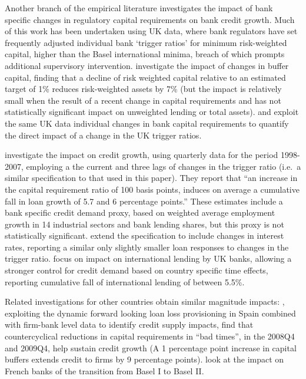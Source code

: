 \documentclass[
  12,
]{article}
\begin{document}
Another branch of the empirical literature investigates the impact of bank specific changes in regulatory capital requirements on bank credit growth. Much of this work has been undertaken using UK data, where bank regulators have set frequently adjusted individual bank `trigger ratios' for minimum risk-weighted capital, higher than the Basel international minima, breach of which prompts additional supervisory intervention. \citet{francis2012capital} investigate the impact of changes in buffer capital, finding that a decline of risk weighted capital relative to an estimated target of 1\% reduces risk-weighted assets by 7\% (but the impact is relatively small when the result of a recent change in capital requirements and has not statistically significant impact on unweighted lending or total assets). \citet{aiyar2014international} and \citet{aiyar2016does} exploit the same UK data individual changes in bank capital requirements to quantify the direct impact of a change in the UK trigger ratios.

\citet{aiyar2014international} investigate the impact on credit growth, using quarterly data for the period 1998-2007, employing a the current and three lags of changes in the trigger ratio (i.e.~a similar specification to that used in this paper). They report that ``an increase in the capital requirement ratio of 100 basis points, induces on average a cumulative fall in loan growth of 5.7 and 6 percentage points.'' These estimates include a bank specific credit demand proxy, based on weighted average employment growth in 14 industrial sectors and bank lending shares, but this proxy is not statistically significant. \citet{aiyar2016does} extend the specification to include changes in interest rates, reporting a similar only slightly smaller loan responses to changes in the trigger ratio. \citet{aiyar2016does} focus on impact on international lending by UK banks, allowing a stronger control for credit demand based on country specific time effects, reporting cumulative fall of international lending of between 5.5\%.

Related investigations for other countries obtain similar magnitude impacts: \citet{jimenez2017macroprudential}, exploiting the dynamic forward looking loan loss provisioning in Spain combined with firm-bank level data to identify credit supply impacts, find that countercyclical reductions in capital requirements in ``bad times'', in the 2008Q4 and 2009Q4, help sustain credit growth (A 1 percentage point increase in capital buffers extends credit to firms by 9 percentage points). \citet{fraisse2020real} look at the impact on French banks of the transition from Basel I to Basel II.
\end{document}
